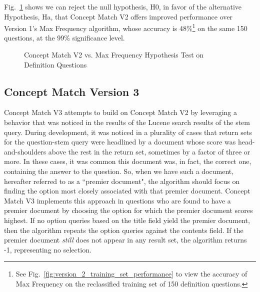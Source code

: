 Fig.~\ref{fig:concept_match_v2_hypothesis_test} shows we can reject the null hypothesis, H0, in favor of the alternative Hypothesis, Ha, that Concept Match V2 offers improved performance over Version 1's Max Frequency algorithm, whose accuracy is 48\%\footnote{See Fig.~\ref{fig:version_2_training_set_performance} to view the accuracy of Max Frequency on the reclassified training set of 150 definition questions.} on the same 150 questions, at the 99\% significance level.

\begin{figure}
\centering
\vspace{1.0in}
\caption{Concept Match V2 vs. Max Frequency Hypothesis Test on Definition Questions}
\label{fig:concept_match_v2_hypothesis_test}
\end{figure}


\subsection{Concept Match Version 3}

Concept Match V3 attempts to build on Concept Match V2 by leveraging a behavior that was noticed in the results of the Lucene search results of the stem query.  
During development, it was noticed in a plurality of cases that return sets for the question-stem query were headlined by a document whose score was head-and-shoulders above the rest in the return set, sometimes by a factor of three or more.  In these cases, it was common this document was, in fact, the correct one, containing the answer to the question.  So, when we have such a document, hereafter referred to as a ``premier document", the algorithm should focus on finding the option most closely associated with that premier document.  Concept Match V3 implements this approach in questions who are found to have a premier document by choosing the option for which the premier document scores highest.  If no option queries based on the title field yield the premier document, then the algorithm repeats the option queries against the contents field.  If the premier document \emph{still} does not appear in any result set, the algorithm returns -1, representing no selection.

